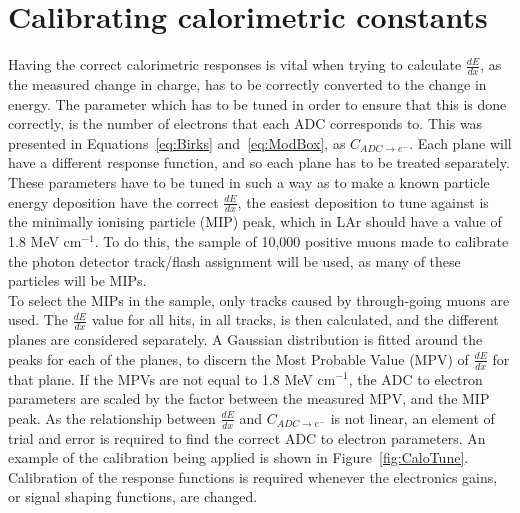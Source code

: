 \section{Calibrating calorimetric constants} \label{sec:MCCalib} %
Having the correct calorimetric responses is vital when trying to calculate $\frac{dE}{dx}$, as the measured change in charge, has to be correctly converted to the change in energy. The parameter which has to be tuned in order to ensure that this is done correctly, is the number of electrons that each ADC corresponds to. This was presented in Equations~\ref{eq:Birks} and~\ref{eq:ModBox}, as $C_{ADC \rightarrow e^{-}}$. Each plane will have a different response function, and so each plane has to be treated separately. These parameters have to be tuned in such a way as to make a known particle energy deposition have the correct $\frac{dE}{dx}$, the easiest deposition to tune against is the minimally ionising particle (MIP) peak, which in LAr should have a value of 1.8 MeV cm$^{-1}$. To do this, the sample of 10,000 positive muons made to calibrate the photon detector track/flash assignment will be used, as many of these particles will be MIPs. \\

To select the MIPs in the sample, only tracks caused by through-going muons are used. The $\frac{dE}{dx}$ value for all hits, in all tracks, is then calculated, and the different planes are considered separately. A Gaussian distribution is fitted around the peaks for each of the planes, to discern the Most Probable Value (MPV) of $\frac{dE}{dx}$ for that plane. If the MPVs are not equal to 1.8 MeV cm$^{-1}$, the ADC to electron parameters are scaled by the factor between the measured MPV, and the MIP peak. As the relationship between $\frac{dE}{dx}$ and $C_{ADC \rightarrow e^{-}}$ is not linear, an element of trial and error is required to find the correct ADC to electron parameters. An example of the calibration being applied is shown in Figure~\ref{fig:CaloTune}. Calibration of the response functions is required whenever the electronics gains, or signal shaping functions, are changed.

